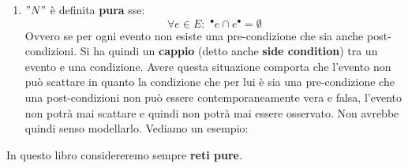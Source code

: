 \begin{definizione}
\begin{enumerate}
\begin{center}
    \end{center}
    \item $"N"$ è definita \textbf{pura} sse:
    \[\forall e \in E:\,\,^\bullet e \cap e^\bullet = \emptyset\]
    Ovvero se per ogni evento non esiste una pre-condizione che sia anche
    post-condizioni. Si ha quindi un \textbf{cappio} (detto anche \textbf{side
      condition}) tra un evento e una condizione. Avere questa situazione
    comporta che l'evento non può scattare in quanto la condizione che per lui è
    sia una pre-condizione che una post-condizioni non può essere
    contemporaneamente vera e falsa, l'evento non potrà mai scattare e quindi
    non potrà mai essere osservato. Non avrebbe quindi senso modellarlo. Vediamo
    un esempio:
    \begin{center}
  \end{center}
    
  \end{enumerate}
\end{definizione} \vspace{5mm} %
\begin{nota}
In questo libro considereremo sempre \textbf{reti pure}.
\end{nota}
